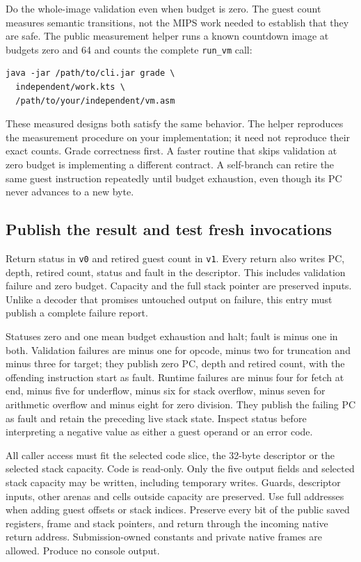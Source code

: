 Do the whole-image validation even when budget is zero. The guest count measures
semantic transitions, not the MIPS work needed to establish that they are safe.
The public measurement helper runs a known countdown image at budgets zero and
64 and counts the complete \texttt{run\_vm} call:
\begin{verbatim}
java -jar /path/to/cli.jar grade \
  independent/work.kts \
  /path/to/your/independent/vm.asm
\end{verbatim}



These measured designs both satisfy the same behavior. The helper reproduces
the measurement procedure on your implementation; it need not reproduce their
exact counts. Grade correctness first. A faster routine that skips validation
at zero budget is implementing a different contract. A self-branch can retire
the same guest instruction repeatedly until budget exhaustion, even though its
PC never advances to a new byte.

\subsection*{Publish the result and test fresh invocations}

Return status in \texttt{v0} and retired guest count in \texttt{v1}. Every return
also writes PC, depth, retired count, status and fault in the descriptor. This
includes validation failure and zero budget. Capacity and the full stack pointer
are preserved inputs. Unlike a decoder that promises untouched output on
failure, this entry must publish a complete failure report.

Statuses zero and one mean budget exhaustion and halt; fault is minus one in
both. Validation failures are minus one for opcode, minus two for truncation
and minus three for target; they publish zero PC, depth and retired count,
with the offending instruction start as fault. Runtime failures are minus four
for fetch at end, minus five for underflow, minus six for stack overflow,
minus seven for arithmetic overflow and minus eight for zero division. They
publish the failing PC as fault and retain the preceding live stack state.
Inspect status before interpreting a negative value as either a guest operand
or an error code.

All caller access must fit the selected code slice, the 32-byte descriptor or
the selected stack capacity. Code is read-only. Only the five output fields
and selected stack capacity may be written, including temporary writes.
Guards, descriptor inputs, other arenas and cells outside capacity are preserved.
Use full addresses when adding guest offsets or stack indices. Preserve every
bit of the public saved registers, frame and stack pointers, and return through
the incoming native return address. Submission-owned constants and private
native frames are allowed. Produce no console output.

